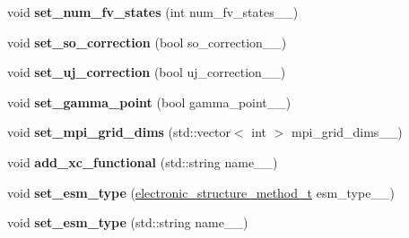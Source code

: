 \begin{DoxyCompactItemize}
\item 
\hypertarget{classsirius_1_1_simulation__parameters_a3678aff62a5d52855a6e6d7643c6a223}{}void {\bfseries set\+\_\+num\+\_\+fv\+\_\+states} (int num\+\_\+fv\+\_\+states\+\_\+\+\_\+)\label{classsirius_1_1_simulation__parameters_a3678aff62a5d52855a6e6d7643c6a223}

\item 
\hypertarget{classsirius_1_1_simulation__parameters_a5dcd39c0c6c7e1babf4c10a5a2201877}{}void {\bfseries set\+\_\+so\+\_\+correction} (bool so\+\_\+correction\+\_\+\+\_\+)\label{classsirius_1_1_simulation__parameters_a5dcd39c0c6c7e1babf4c10a5a2201877}

\item 
\hypertarget{classsirius_1_1_simulation__parameters_a1765e3310d9f589bff260cabd6a2c9f3}{}void {\bfseries set\+\_\+uj\+\_\+correction} (bool uj\+\_\+correction\+\_\+\+\_\+)\label{classsirius_1_1_simulation__parameters_a1765e3310d9f589bff260cabd6a2c9f3}

\item 
\hypertarget{classsirius_1_1_simulation__parameters_acd1eae7a32b14363986e455b826fcf1a}{}void {\bfseries set\+\_\+gamma\+\_\+point} (bool gamma\+\_\+point\+\_\+\+\_\+)\label{classsirius_1_1_simulation__parameters_acd1eae7a32b14363986e455b826fcf1a}

\item 
\hypertarget{classsirius_1_1_simulation__parameters_ac5535c7febf5474c2dd347239632940a}{}void {\bfseries set\+\_\+mpi\+\_\+grid\+\_\+dims} (std\+::vector$<$ int $>$ mpi\+\_\+grid\+\_\+dims\+\_\+\+\_\+)\label{classsirius_1_1_simulation__parameters_ac5535c7febf5474c2dd347239632940a}

\item 
\hypertarget{classsirius_1_1_simulation__parameters_ac8eecc532928192b3fdf3688b0cf9f5d}{}void {\bfseries add\+\_\+xc\+\_\+functional} (std\+::string name\+\_\+\+\_\+)\label{classsirius_1_1_simulation__parameters_ac8eecc532928192b3fdf3688b0cf9f5d}

\item 
\hypertarget{classsirius_1_1_simulation__parameters_a1c9490c05cec5181c61ccc69b3ab46a8}{}void {\bfseries set\+\_\+esm\+\_\+type} (\hyperlink{typedefs_8h_ad0240253ab18ec5b88c5e78866b1128a}{electronic\+\_\+structure\+\_\+method\+\_\+t} esm\+\_\+type\+\_\+\+\_\+)\label{classsirius_1_1_simulation__parameters_a1c9490c05cec5181c61ccc69b3ab46a8}

\item 
\hypertarget{classsirius_1_1_simulation__parameters_a48bb184d392da3b062702a9690d21407}{}void {\bfseries set\+\_\+esm\+\_\+type} (std\+::string name\+\_\+\+\_\+)\label{classsirius_1_1_simulation__parameters_a48bb184d392da3b062702a9690d21407}


\end{DoxyCompactItemize}
